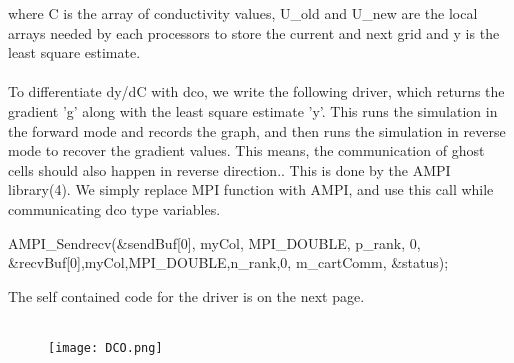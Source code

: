 \documentclass[10pt,a4paper]{report}
\begin{document}
\begin{appendices}
where C is the array of conductivity values, U\_old and U\_new are the local arrays needed by each processors to store the current and next grid and y is the least square estimate. \\
\\
To differentiate dy/dC with dco, we write the following driver, which returns the gradient 'g' along with the least square estimate 'y'. This runs the simulation in the forward mode and records the graph, and then runs the simulation in reverse mode to recover the gradient values. This means, the communication of ghost cells should also happen in reverse direction.. This is done by the AMPI library(4). We simply replace MPI function with AMPI, and use this call while communicating dco type variables.
\begin{snugshade}
\begin{flushleft}
AMPI\_Sendrecv(\&sendBuf[0], myCol, MPI\_DOUBLE, p\_rank, 0, \&recvBuf[0],myCol,MPI\_DOUBLE,n\_rank,0, m\_cartComm, \&status);
\end{flushleft}
\end{snugshade}
The self contained code for the driver is on the next page.  \\
\\
\begin{figure}[h]
\begin{center}
\texttt{[image: DCO.png]} 
\label{fig:DCO}
\end{center}
\end{figure}
%
%
%
%

\end{appendices}
\end{document}
